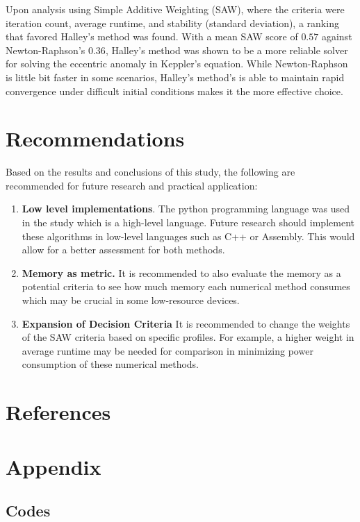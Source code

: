 \documentclass[a4paper,11pt]{article}
\begin{document}
Upon analysis using Simple Additive Weighting (SAW), where the criteria were iteration count, average runtime, and stability (standard deviation), a ranking that favored Halley's method was found. With a mean SAW score of $0.57$ against Newton-Raphson's $0.36$, Halley's method was shown to be a more reliable solver for solving the eccentric anomaly in Keppler's equation. While Newton-Raphson is little bit faster in some scenarios, Halley's method's is able to maintain rapid convergence under difficult initial conditions makes it the more effective choice.

\section{Recommendations}

Based on the results and conclusions of this study, the following are recommended for future research and practical application:
\begin{enumerate}
    \item \textbf{Low level implementations}. The python programming language was used in the study which is a high-level language. Future research should implement these algorithms in low-level languages such as C++ or Assembly. This would allow for a better assessment for both methods. 
    \item \textbf{Memory as metric.} It is recommended to also evaluate the memory as a potential criteria to see how much memory each numerical method consumes which may be crucial in some low-resource devices.
    \item \textbf{Expansion of Decision Criteria} It is recommended to change the weights of the SAW criteria based on specific profiles. For example, a higher weight in average runtime may be needed for comparison in minimizing power consumption of these numerical methods.


\end{enumerate}


\newpage
\section{References}
\printbibliography[heading=none]
\newpage

\appendix
\section{Appendix}

\subsection{Codes}
\end{document}
